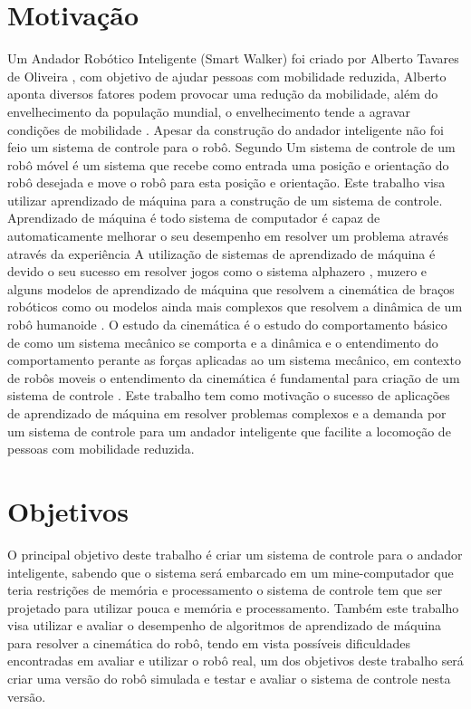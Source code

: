 \label{Cap:Introducao}

\section{Motivação}

Um Andador Robótico Inteligente (Smart Walker) foi criado por Alberto Tavares de Oliveira ,
com objetivo de ajudar pessoas com mobilidade reduzida, Alberto aponta
diversos fatores podem provocar uma redução da mobilidade, além do 
envelhecimento da população mundial, o envelhecimento tende a agravar
condições de mobilidade \cite{oliveira2022projeto}. Apesar da construção
do andador inteligente não foi feio um sistema de controle para o robô.
Segundo \cite{siegwart2011introduction} Um sistema de controle de um
robô móvel  é um sistema que recebe como entrada uma posição
e orientação do robô desejada e move o robô para esta posição e orientação.
Este trabalho visa utilizar aprendizado de máquina para a construção de um
sistema de controle. Aprendizado de máquina é todo
sistema de computador é capaz de automaticamente melhorar o seu desempenho
em resolver um problema através através da experiência \cite{mitchell1990machine}
A utilização de sistemas de aprendizado de máquina é devido o seu sucesso em
resolver jogos como o sistema alphazero \cite{silver2017mastering}, muzero
\cite{schrittwieser2020mastering} e alguns modelos de aprendizado de máquina
que resolvem a cinemática de braços robóticos como \cite{cavalcanti2017self}
ou modelos ainda mais complexos que resolvem a dinâmica de um robô humanoide
\cite{phaniteja2017deep}. O estudo da cinemática é o estudo do comportamento
básico de como um sistema mecânico se comporta e a dinâmica e o entendimento
do comportamento perante as forças aplicadas ao um sistema mecânico, em contexto
de robôs moveis o entendimento da cinemática é fundamental para criação de um
sistema de controle \cite{siegwart2011introduction}. Este trabalho tem como
motivação o sucesso de aplicações de aprendizado de máquina em resolver problemas
complexos e a demanda por um sistema de controle para um andador
inteligente que facilite a locomoção de pessoas com mobilidade reduzida. 

\section{Objetivos}

O principal objetivo deste trabalho é criar um  sistema de
controle para o andador inteligente, sabendo que o sistema será
embarcado em um mine-computador que teria restrições de memória e
processamento o sistema de controle tem que ser projetado para utilizar
pouca e memória e processamento.
Também este trabalho visa utilizar e avaliar o desempenho de algoritmos
de aprendizado de máquina para resolver a cinemática do robô, tendo em
vista possíveis dificuldades encontradas em avaliar e utilizar o robô real,
um dos objetivos deste trabalho será criar uma versão do robô simulada e
testar e avaliar o sistema de controle nesta versão.

